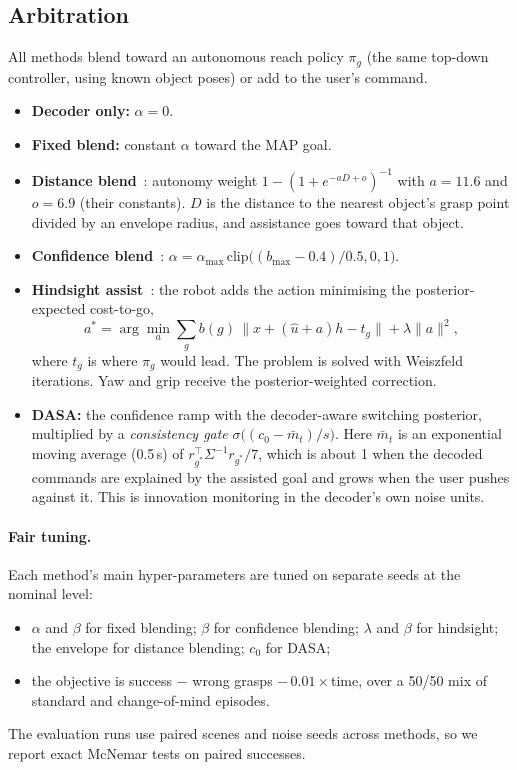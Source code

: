\subsection{Arbitration}
All methods blend toward an autonomous reach policy $\pi_g$ (the same top-down
controller, using known object poses) or add to the user's command.
\begin{itemize}
\item \textbf{Decoder only:} $\alpha=0$.
\item \textbf{Fixed blend:} constant $\alpha$ toward the MAP goal.
\item \textbf{Distance blend}~\cite{downey2016blending}: autonomy weight
  $1-(1+e^{-aD+o})^{-1}$ with $a=11.6$ and $o=6.9$ (their constants). $D$ is the
  distance to the nearest object's grasp point divided by an envelope radius, and
  assistance goes toward that object.
\item \textbf{Confidence blend}~\cite{dragan2013policy}:
  $\alpha=\alpha_{\max}\,\mathrm{clip}\big((b_{\max}-0.4)/0.5,0,1\big)$.
\item \textbf{Hindsight assist}~\cite{javdani2015shared}: the robot adds the action
  minimising the posterior-expected cost-to-go,
  \begin{equation}
  a^*=\arg\min_a\sum_g b(g)\,\|x+(\hat u+a)h-t_g\|+\lambda\|a\|^2 ,
  \end{equation}
  where $t_g$ is where $\pi_g$ would lead. The problem is solved with Weiszfeld
  iterations. Yaw and grip receive the posterior-weighted correction.
\item \textbf{DASA:} the confidence ramp with the decoder-aware switching posterior,
  multiplied by a \emph{consistency gate}
  $\sigma\big((c_0-\bar m_t)/s\big)$. Here $\bar m_t$ is an exponential moving average
  (0.5\,s) of $r_{g^*}^\top\Sigma^{-1}r_{g^*}/7$, which is about 1 when the decoded
  commands are explained by the assisted goal and grows when the user pushes against
  it. This is innovation monitoring in the decoder's own noise units.
\end{itemize}

\paragraph{Fair tuning.} Each method's main hyper-parameters are tuned on separate
seeds at the nominal level:
\begin{itemize}
\item $\alpha$ and $\beta$ for fixed blending; $\beta$ for confidence blending;
  $\lambda$ and $\beta$ for hindsight; the envelope for distance blending; $c_0$ for DASA;
\item the objective is success $-$ wrong grasps $-\,0.01\times$time, over a 50/50 mix
  of standard and change-of-mind episodes.
\end{itemize}
The evaluation runs use paired scenes and noise seeds across methods, so we report
exact McNemar tests on paired successes.

